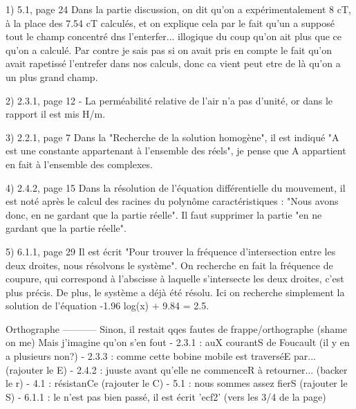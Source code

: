 
1) 5.1, page 24
Dans la partie discussion, on dit qu'on a expérimentalement 8 cT, à la place des 7.54 cT calculés, et on explique 
cela par le fait qu'un a supposé tout le champ concentré dns l'enterfer... illogique du coup qu'on ait plus que ce qu'on a calculé.
Par contre je sais pas si on avait pris en compte le fait qu'on avait rapetissé l'entrefer dans nos calculs, donc ca vient peut
etre de là qu'on a un plus grand champ.

2) 2.3.1, page 12
- La perméabilité relative de l'air n'a pas d'unité, or dans le rapport il est mis H/m.

3) 2.2.1, page 7
Dans la "Recherche de la solution homogène", il est indiqué "A est une constante appartenant
à l'ensemble des réels", je pense que A appartient en fait à l'ensemble des complexes.

4) 2.4.2, page 15
Dans la résolution de l'équation différentielle du mouvement, il est noté après le calcul
des racines du polynôme caractéristiques : "Nous avons donc, en ne gardant que la partie réelle".
Il faut supprimer la partie "en ne gardant que la partie réelle".

5) 6.1.1, page 29
Il est écrit "Pour trouver la fréquence d'intersection entre les deux droites, nous résolvons le système".
On recherche en fait la fréquence de coupure, qui correspond à l'abscisse à laquelle s'intersecte les
deux droites, c'est plus précis. De plus, le système a déjà été résolu. Ici on recherche simplement la
solution de l'équation -1.96 log(x) + 9.84 = 2.5.

Orthographe
-----------
Sinon, il restait qqes fautes de frappe/orthographe (shame on me) Mais j'imagine qu'on s'en fout
- 2.3.1 : auX courantS de Foucault (il y en a plusieurs non?)
- 2.3.3 : comme cette bobine mobile est traverséE par... (rajouter le E)
- 2.4.2 : juuste avant qu'elle ne commenceR à retourner... (backer le r)
- 4.1 : résistanCe (rajouter le C)
- 5.1 : nous sommes assez fierS (rajouter le S)
- 6.1.1 : le \vec n'est pas bien passé, il est écrit 'ecf2' (vers les 3/4 de la page)
